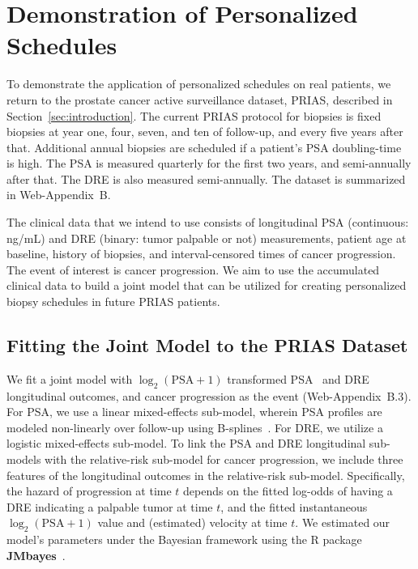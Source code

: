 \section{Demonstration of Personalized Schedules}
\label{sec:results}
To demonstrate the application of personalized schedules on real patients, we return to the prostate cancer active surveillance dataset, PRIAS, described in Section~\ref{sec:introduction}. The current PRIAS protocol for biopsies is fixed biopsies at year one, four, seven, and ten of follow-up, and every five years after that. Additional annual biopsies are scheduled if a patient's PSA doubling-time~\citep{bokhorst2015compliance} is high. The PSA is measured quarterly for the first two years, and semi-annually after that. The DRE is also measured semi-annually. The dataset is summarized in Web-Appendix~B.

The clinical data that we intend to use consists of longitudinal PSA (continuous: ng/mL) and DRE (binary: tumor palpable or not) measurements, patient age at baseline, history of biopsies, and interval-censored times of cancer progression. The event of interest is cancer progression. We aim to use the accumulated clinical data to build a joint model that can be utilized for creating personalized biopsy schedules in future PRIAS patients.

\subsection{Fitting the Joint Model to the PRIAS Dataset}
We fit a joint model with $\log_2(\mbox{PSA} + 1)$ transformed PSA~\citep{tomer2019personalized} and DRE longitudinal outcomes, and cancer progression as the event (Web-Appendix~B.3). For PSA, we use a linear mixed-effects sub-model, wherein PSA profiles are modeled non-linearly over follow-up using B-splines~\citep{de1978practical}. For DRE, we utilize a logistic mixed-effects sub-model. To link the PSA and DRE longitudinal sub-models with the relative-risk sub-model for cancer progression, we include three features of the longitudinal outcomes in the relative-risk sub-model. Specifically, the hazard of progression at time $t$ depends on the fitted log-odds of having a DRE indicating a palpable tumor at time $t$, and the fitted instantaneous $\log_2(\mbox{PSA} + 1)$ value and (estimated) velocity at time $t$. We estimated our model's parameters under the Bayesian framework using the R package \textbf{JMbayes}~\citep{rizopoulosJMbayes}.  

